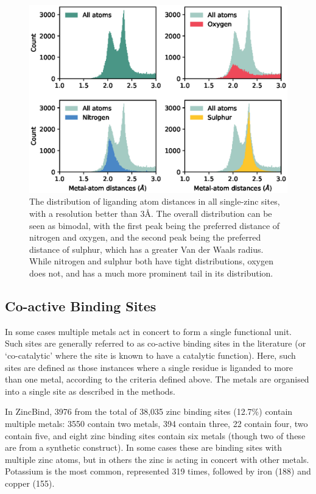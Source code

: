 \begin{figure}
\centering
\includegraphics[width=1.0\textwidth]{Figures/atom-distances.eps}
\caption[The distribution of liganding atom distances in all single-zinc sites.]{\label{fig:atom-distances} The distribution of liganding atom
  distances in all single-zinc sites, with a resolution better than
  3\AA. The overall distribution can be seen as bimodal, with the
  first peak being the preferred distance of nitrogen and oxygen, and
  the second peak being the preferred distance of sulphur, which has a
  greater Van der Waals radius.  While nitrogen and sulphur both have
  tight distributions, oxygen does not, and has a much more prominent
  tail in its distribution.}
\end{figure}

\subsection{Co-active Binding Sites}

In some cases multiple metals act in concert to form a single functional unit. Such sites are generally referred to as co-active binding sites in the literature (or `co-catalytic' where the site is known to have a catalytic function). Here, such sites are defined as those instances where a single residue is liganded to more than one metal, according to the criteria defined above. The metals are organised into a single site as described in the methods.

In ZincBind, 3976 from the total of 38,035 zinc binding sites (12.7\%) contain multiple metals: 3550 contain two metals, 394 contain three, 22 contain four, two contain five, and eight zinc binding sites contain six metals (though two of these are from a synthetic construct). In some cases these are binding sites with multiple zinc atoms, but in others the zinc is acting in concert with other metals. Potassium is the most common, represented 319 times, followed by iron (188) and copper (155).

